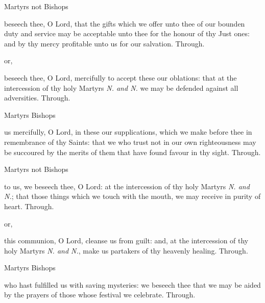 
\clearpage
\secret
\begin{inhead}
	Martyrs not Bishops
\end{inhead}
 beseech thee, O Lord, that the gifts which we offer unto thee of our bounden duty and service may be acceptable unto thee for the honour of thy Just ones: and by thy mercy profitable unto us for our salvation. Through.

\begin{inhead}
	or,
\end{inhead}

 beseech thee, O Lord, mercifully to accept these our oblations: that at the intercession of thy holy Martyrs \textit{N. and N.} we may be defended against all adversities. Through.

\begin{inhead}
	Martyrs Bishops
\end{inhead}
 us mercifully, O Lord, in these our supplications, which we make before thee in remembrance of thy Saints: that we who trust not in our own righteousness may be succoured by the merits of them that have found favour in thy sight. Through.


\postcommunion
\begin{inhead}
	Martyrs not Bishops
\end{inhead}
 to us, we beseech thee, O Lord: at the intercession of thy holy Martyrs \textit{N. and N.}; that those things which we touch with the mouth, we may receive in purity of heart. Through.

\begin{inhead}
	or,
\end{inhead}

 this communion, O Lord, cleanse us from guilt: and, at the intercession of thy holy Martyrs \textit{N. and N.}, make us partakers of thy heavenly healing. Through.

\begin{inhead}
	Martyrs Bishops
\end{inhead}
 who hast fulfilled us with saving mysteries: we beseech thee that we may be aided by the prayers of those whose festival we celebrate. Through.

